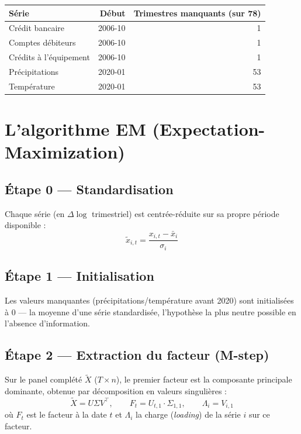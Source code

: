 \documentclass[11pt,a4paper]{article}
\begin{document}
\begin{fichebox}
\begin{center}
\begin{tabular}{lrr}
\toprule
\textbf{Série} & \textbf{Début} & \textbf{Trimestres manquants (sur 78)} \\
\midrule
Crédit bancaire & 2006-10 & 1 \\
Comptes débiteurs & 2006-10 & 1 \\
Crédits à l'équipement & 2006-10 & 1 \\
Précipitations & 2020-01 & 53 \\
Température & 2020-01 & 53 \\
\bottomrule
\end{tabular}
\end{center}
\end{fichebox}

\section{L'algorithme EM (Expectation-Maximization)}

\subsection{Étape 0 --- Standardisation}

Chaque série (en $\Delta\log$ trimestriel) est centrée-réduite sur sa propre période disponible :
\begin{equation}
\tilde{x}_{i,t} = \frac{x_{i,t} - \bar{x}_i}{\sigma_i}
\end{equation}

\subsection{Étape 1 --- Initialisation}

Les valeurs manquantes (précipitations/température avant 2020) sont initialisées à 0 --- la moyenne d'une série standardisée, l'hypothèse la plus neutre possible en l'absence d'information.

\subsection{Étape 2 --- Extraction du facteur (M-step)}

Sur le panel complété $\tilde{X}$ ($T\times n$), le premier facteur est la composante principale dominante, obtenue par décomposition en valeurs singulières :
\begin{equation}
\tilde{X} = U\Sigma V^\top, \qquad F_t = U_{t,1}\cdot\Sigma_{1,1}, \qquad \Lambda_i = V_{i,1}
\end{equation}
où $F_t$ est le facteur à la date $t$ et $\Lambda_i$ la charge (\emph{loading}) de la série $i$ sur ce facteur.
\end{document}
